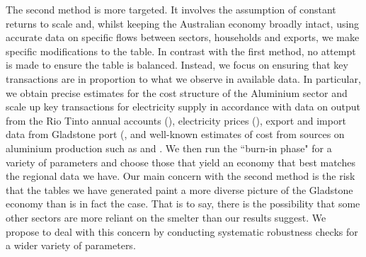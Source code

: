 \documentclass[12pt,a4paper]{article}
\begin{document}

The second method is more targeted. It involves the assumption of constant
returns to scale and, whilst keeping the Australian economy broadly intact,
using accurate data on specific flows between sectors, households and exports,
we make specific modifications to the table. In contrast with the first method,
no attempt is made to ensure the table is balanced. 
%
%
%    
%
%
%
%
%
%
%
Instead, we focus on ensuring that key transactions are in proportion to what
we observe in available data. In particular, we obtain precise estimates for
the cost structure of the Aluminium sector and scale up key transactions for
electricity supply in accordance with data on output from the Rio Tinto annual
accounts (\cite{RT}), electricity prices (\cite{AEMO}), export and import data
from Gladstone port (\cite{port}, and well-known estimates of cost from sources
on aluminium production such as \cite{GN-Aluminium-smelters} and \cite{bat}.
We then run the ``burn-in phase" for a variety of parameters and choose those
that yield an economy that best matches the regional data we have.  Our main
concern with the second method is the risk that the tables we have generated
paint a more diverse picture of the Gladstone economy than is in fact the case.
That is to say, there is the possibility that some other sectors are more
reliant on the smelter than our results suggest. We propose to deal with this
concern by conducting systematic robustness checks for a wider variety of
parameters.
\end{document}
